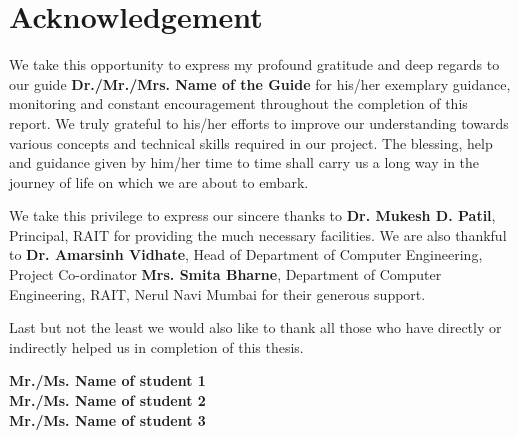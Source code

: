 \chapter*{\centering Acknowledgement}
\hspace{0.26in}We take this opportunity to express my profound gratitude and deep regards to our guide \textbf{Dr./Mr./Mrs. Name of the Guide} for his/her exemplary guidance, monitoring and constant encouragement throughout the completion of this report. We truly grateful to his/her efforts to improve our understanding towards various concepts and technical skills required in our project. The blessing, help and guidance given by him/her time to time shall carry us a long way in the journey of life on which we are about to embark.

We take this privilege to express our sincere thanks to \textbf{Dr. Mukesh D. Patil}, Principal, RAIT for providing the much necessary facilities. We are also thankful to \textbf{Dr. Amarsinh Vidhate}, Head of Department of Computer Engineering, Project Co-ordinator \textbf{Mrs. Smita Bharne}, Department of Computer Engineering, RAIT, Nerul Navi Mumbai for their generous support.

Last but not the least we would also like to thank all those who have directly or indirectly helped us in completion of this thesis.
\vspace{0.5in}\\

\begin{flushright}
{\bf  Mr./Ms. Name of student 1}\\
{\bf  Mr./Ms. Name of student 2}\\
{\bf  Mr./Ms. Name of student 3}
\end{flushright}
